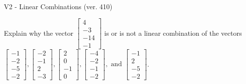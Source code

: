 \begin{exercise}
  \begin{exerciseTitle}V2 - Linear Combinations (ver. 410)\end{exerciseTitle}
  \begin{exerciseStatement}
    Explain why the vector \(\left[\begin{array}{c}
4 \\
-3 \\
-14 \\
-1
\end{array}\right]\)  is or is not a linear 
	combination of the vectors \(\left[\begin{array}{c}
-1 \\
-2 \\
-5 \\
-2
\end{array}\right] , \left[\begin{array}{c}
-2 \\
-1 \\
2 \\
-3
\end{array}\right] , \left[\begin{array}{c}
2 \\
0 \\
-1 \\
0
\end{array}\right] , \left[\begin{array}{c}
-4 \\
-2 \\
-1 \\
-2
\end{array}\right] , \text{ and } \left[\begin{array}{c}
-1 \\
2 \\
-5 \\
-2
\end{array}\right]\).
	



\end{exerciseStatement}
\end{exercise}
